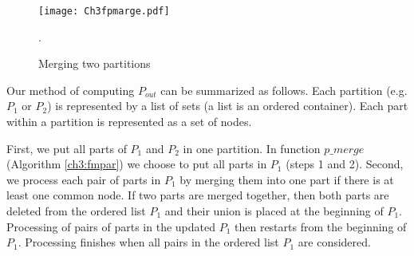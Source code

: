 \begin{figure}[!htb]
\centering
\texttt{[image: Ch3fpmarge.pdf]}
 \caption{ Merging two partitions}.
 \label{fig:ftc}
\end{figure}

Our method of computing $P_{out}$ can be summarized as follows. Each partition (e.g. $P_1$ or $P_2$) is represented by a list of sets (a list is an ordered container). Each part within a partition is represented as a set of nodes. 


First, we put all parts of $P_1$ and $P_2$ in one partition. In function $p\_merge$ (Algorithm \ref{ch3:fmpar}) we choose to put all parts in $P_1$ (steps 1 and 2). Second, we process each pair of parts in $P_1$ by merging them into one part if there is at least one common node. If two parts are merged together, then both parts are deleted from the ordered list $P_1$ and their union is placed at the beginning of $P_1$. Processing of pairs of parts in the updated $P_1$ then restarts from the beginning of $P_1$. Processing finishes when all pairs in the ordered list $P_1$ are considered.


%


